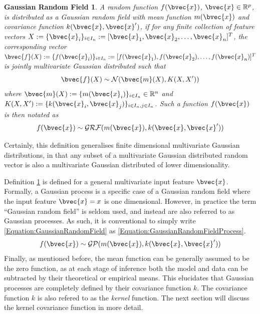 			\newtheorem{grfdef}{Gaussian Random Field}[section]
			\begin{grfdef}
				A random function $f(\bvec{x})$, $\bvec{x} \in \mathbb{R}^{p}$, is distributed as a Gaussian random field with mean function $m(\bvec{x})$ and covariance function $k(\bvec{x}, \bvec{x}')$, if for any finite collection of feature vectors $X := \{\bvec{x}_{i}\}_{i \in I_{n}} := [\bvec{x}_{1}, \bvec{x}_{2}, \dots, \bvec{x}_{n}]^{T}$, the corresponding vector $\bvec{f}(X) := \{f(\bvec{x}_{i})\}_{i \in I_{n}} := [f(\bvec{x}_{1}), f(\bvec{x}_{2}), \dots, f(\bvec{x}_{n})]^{T}$ is jointly multivariate Gaussian distributed such that \begin{equation}
						\bvec{f}(X) \sim \mathcal{N}(\bvec{m}(X), K(X, X'))
					\label{Equation:GaussianRandomFieldFiniteDistribution}
					\end{equation} where $\bvec{m}(X) :=  \{m(\bvec{x}_{i})\}_{i \in I_{n}} \in \mathbb{R}^{n}$ and $K(X, X') := \{k(\bvec{x}_{i}, \bvec{x}_{j})\}_{i \in I_{n}, j \in I_{n}}$. Such a function $f(\bvec{x})$ is then notated as \begin{equation}
						f(\bvec{x}) \sim \mathcal{GRF}(m(\bvec{x}), k(\bvec{x}, \bvec{x}'))
					\label{Equation:GaussianRandomField}
					\end{equation}	
					
			\label{Definition:GaussianRandomField}
			\end{grfdef} Certainly, this definition generalises finite dimensional multivariate Gaussian distributions, in that any subset of a multivariate Gaussian distributed random vector is also a multivariate Gaussian distributed of lower dimensionality.

			Definition \ref{Definition:GaussianRandomField} is defined for a general multivariate input feature $\bvec{x}$. Formally, a Gaussian process is a specific case of a Gaussian random field where the input feature $\bvec{x} = x$ is one dimensional. However, in practice the term ``Gaussian random field'' is seldom used, and instead are also referred to as Gaussian processes. As such, it is conventional to simply write \eqref{Equation:GaussianRandomField} as \eqref{Equation:GaussianRandomFieldProcess}. \begin{equation}
				f(\bvec{x}) \sim \mathcal{GP}(m(\bvec{x}), k(\bvec{x}, \bvec{x}'))
			\label{Equation:GaussianRandomFieldProcess}
			\end{equation} Finally, as mentioned before, the mean function can be generally assumed to be the zero function, as at each stage of inference both the model and data can be subtracted by their theoretical or empirical means. This elucidates that Gaussian processes are completely defined by their covariance function $k$. The covariance function $k$ is also refered to as the \textit{kernel} function. The next section will discuss the kernel covariance function in more detail.
			
